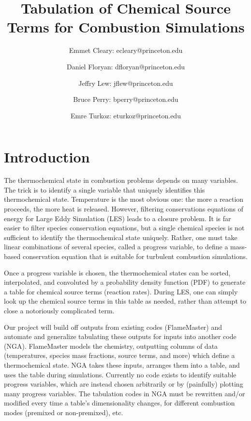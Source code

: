 \documentclass[11pt]{article}
\begin{document}
\title{\textbf{Tabulation of Chemical Source Terms for Combustion Simulations}}
\author{Emmet Cleary: ecleary@princeton.edu \and Daniel Floryan: dfloryan@princeton.edu \and Jeffry Lew: jflew@princeton.edu \and Bruce Perry: bperry@princeton.edu \and Emre Turkoz: eturkoz@princeton.edu}
\date{ } 
\maketitle

\section{Introduction}

The thermochemical state in combustion problems depends on many variables. The trick is to identify a single variable that uniquely identifies this thermochemical state. Temperature is the most obvious one: the more a reaction proceeds, the more heat is released. However, filtering conservations equations of energy for Large Eddy Simulation (LES) leads to a closure problem. It is far easier to filter species conservation equations, but a single chemical species is not sufficient to identify the thermochemical state uniquely. Rather, one must take linear combinations of several species, called a progress variable, to define a mass-based conservation equation that is suitable for turbulent combustion simulations.

Once a progress variable is chosen, the thermochemical states can be sorted, interpolated, and convoluted by a probability density function (PDF) to generate a table for chemical source terms (reaction rates). During LES, one can simply look up the chemical source terms in this table as needed, rather than attempt to close a notoriously complicated term.

Our project will build off outputs from existing codes (FlameMaster) and automate and generalize tabulating these outputs for inputs into another code (NGA). FlameMaster models the chemistry, outputting columns of data (temperatures, species mass fractions, source terms, and more) which define a thermochemical state. NGA takes these inputs, arranges them into a table, and uses the table during simulations. Currently no code exists to identify suitable progress variables, which are instead chosen arbitrarily or by (painfully) plotting many progress variables. The tabulation codes in NGA must be rewritten and/or modified every time a table's dimensionality changes, for different combustion modes (premixed or non-premixed), etc.
\end{document}
